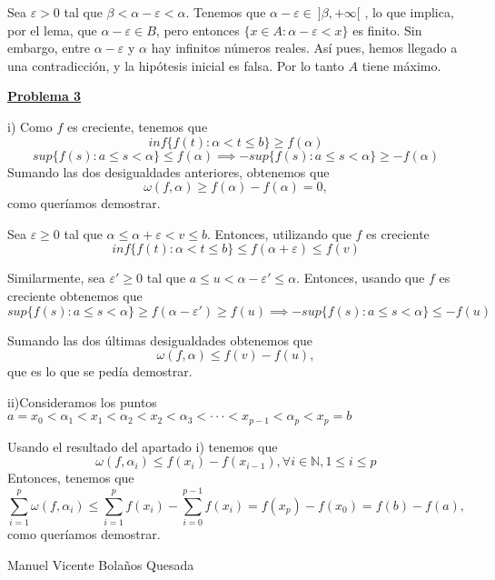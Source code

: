 \documentclass[10pt,a4paper]{article}
\begin{document}
	Sea $\varepsilon > 0$ tal que $\beta < \alpha - \varepsilon < \alpha$. Tenemos que $\alpha - \varepsilon \in ~ ]\beta, +\infty[$ , lo que implica, por el lema, que $\alpha - \varepsilon \in B$, pero entonces $\{x \in A : \alpha - \varepsilon < x\}$ es finito. Sin embargo, entre $\alpha - \varepsilon$ y $\alpha$ hay infinitos números reales. Así pues, hemos llegado a una contradicción, y la hipótesis inicial es falsa. Por lo tanto $A$ tiene máximo.
	
	\begin{flushleft}
		\textbf{\underline{Problema 3}}
	\end{flushleft}
	
	i) Como $f$ es creciente, tenemos que 
	$$inf\{f(t): \alpha < t \leq b\} \geq f(\alpha)$$
	$$sup\{f(s):a \leq s < \alpha\} \leq f(\alpha) \implies -sup\{f(s):a \leq s < \alpha\} \geq -f(\alpha)$$
	Sumando las dos desigualdades anteriores, obtenemos que $$\omega(f, \alpha) \geq f(\alpha) - f(\alpha) = 0,$$ como queríamos demostrar.
	
	Sea $\varepsilon \geq 0$ tal que $\alpha \leq \alpha + \varepsilon < v \leq b$. Entonces, utilizando que $f$ es creciente
	$$inf\{f(t): \alpha < t \leq b\} \leq f(\alpha + \varepsilon) \leq f(v)$$
	
	Similarmente, sea $\varepsilon ' \geq 0$ tal que $a \leq u < \alpha - \varepsilon ' \leq \alpha$. Entonces, usando que $f$ es creciente obtenemos que
	$$sup\{f(s):a \leq s < \alpha\} \geq f(\alpha - \varepsilon ') \geq f(u) \implies -sup\{f(s):a \leq s < \alpha\} \leq -f(u)$$
	
	Sumando las dos últimas desigualdades obtenemos que $$ \omega(f, \alpha) \leq f(v) - f(u),$$ que es lo que se pedía demostrar. \newline
	
	ii)Consideramos los puntos $ a = x_0 < \alpha_1 < x_1 < \alpha_2 < x_2 < \alpha_3 < \cdot \cdot \cdot < x_{p-1} < \alpha_p < x_p = b$
	
	Usando el resultado del apartado i) tenemos que
	$$\omega(f, \alpha_i) \leq f(x_i) - f(x_{i-1}), \forall i \in \mathbb{N}, 1 \leq i \leq p$$
	Entonces, tenemos que $$\sum_{i=1}^{p} \omega(f, \alpha_i) \leq \sum_{i = 1}^{p}f(x_i) - \sum_{i = 0}^{p-1}f(x_i) = f(x_p)-f(x_0) = f(b)-f(a),$$ como queríamos demostrar. \newpage
	
	\begin{flushleft}
		Manuel Vicente Bolaños Quesada	\newline 
	\end{flushleft}	
\end{document}
